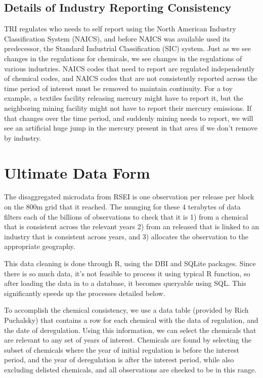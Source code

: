 \documentclass[12pt,twoside]{dukestatscithesis}
\theoremstyle{definition}
\theoremstyle{definition}
\theoremstyle{definition}
\theoremstyle{remark}
\begin{document}
\subsection{Details of Industry Reporting
Consistency}\label{details-of-industry-reporting-consistency}

TRI regulates who needs to self report using the North American Industry
Classification System (NAICS), and before NAICS was available used its
predecessor, the Standard Industrial Classification (SIC) system. Just
as we see changes in the regulations for chemicals, we see changes in
the regulations of various industries. NAICS codes that need to report
are regulated independently of chemical codes, and NAICS codes that are
not consistently reported across the time period of interest must be
removed to maintain continuity. For a toy example, a textiles facility
releasing mercury might have to report it, but the neighboring mining
facility might not have to report their mercury emissions. If that
changes over the time period, and suddenly mining needs to report, we
will see an artificial huge jump in the mercury present in that area if
we don't remove by industry.

\section{Ultimate Data Form}\label{ultimate-data-form}

The disaggregated microdata from RSEI is one observation per release per
block on the 800m grid that it reached. The munging for these 4
terabytes of data filters each of the billions of observations to check
that it is 1) from a chemical that is consistent across the relevant
years 2) from an released that is linked to an industry that is
consistent across years, and 3) allocates the observation to the
appropriate geography.

This data cleaning is done through R, using the DBI and SQLite packages.
Since there is so much data, it's not feasible to process it using
typical R function, so after loading the data in to a database, it
becomes queryable using SQL. This significantly speeds up the processes
detailed below.

To accomplish the chemical consistency, we use a data table (provided by
Rich Puchalsky) that contains a row for each chemical with the data of
regulation, and the date of deregulation. Using this information, we can
select the chemicals that are relevant to any set of years of interest.
Chemicals are found by selecting the subset of chemicals where the year
of initial regulation is before the interest period, and the year of
deregulation is after the interest period, while also excluding delisted
chemicals, and all observations are checked to be in this range.
\end{document}
